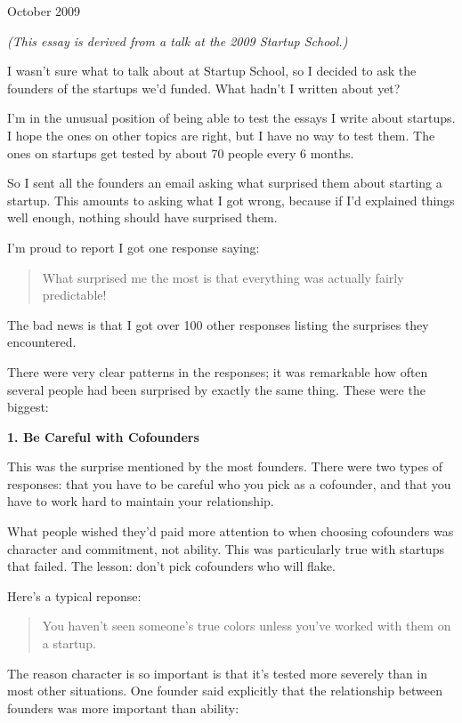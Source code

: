 October 2009

\emph{(This essay is derived from a talk at the 2009 Startup School.)}

I wasn't sure what to talk about at Startup School, so I decided to ask
the founders of the startups we'd funded. What hadn't I written about
yet?

I'm in the unusual position of being able to test the essays I write
about startups. I hope the ones on other topics are right, but I have no
way to test them. The ones on startups get tested by about 70 people
every 6 months.

So I sent all the founders an email asking what surprised them about
starting a startup. This amounts to asking what I got wrong, because if
I'd explained things well enough, nothing should have surprised them.

I'm proud to report I got one response saying:

\begin{quote}
What surprised me the most is that everything was actually fairly
predictable!
\end{quote}

The bad news is that I got over 100 other responses listing the
surprises they encountered.

There were very clear patterns in the responses; it was remarkable how
often several people had been surprised by exactly the same thing. These
were the biggest:

\textbf{1. Be Careful with Cofounders}

This was the surprise mentioned by the most founders. There were two
types of responses: that you have to be careful who you pick as a
cofounder, and that you have to work hard to maintain your relationship.

What people wished they'd paid more attention to when choosing
cofounders was character and commitment, not ability. This was
particularly true with startups that failed. The lesson: don't pick
cofounders who will flake.

Here's a typical reponse:

\begin{quote}
You haven't seen someone's true colors unless you've worked with them on
a startup.
\end{quote}

The reason character is so important is that it's tested more severely
than in most other situations. One founder said explicitly that the
relationship between founders was more important than ability:


